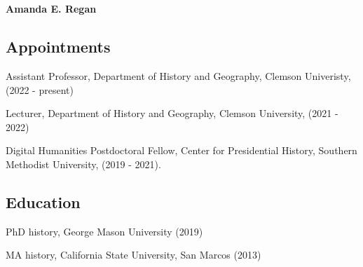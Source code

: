 \documentclass[11pt]{article}
\begin{document}
\thispagestyle{fancy}
\fancyfoot{}
\fancyhead{}
\renewcommand{\headrulewidth}{0pt}


\hfill\hfill\hfill
\hfill\hfill\hfill
\hfill\hfill\hfill
\hfill\hfill\hfill
\begin{minipage}[t]{1.6in}
   \\
   \\
\end{minipage}
\hfill
\begin{minipage}[t]{1.9in}
\end{minipage}


\vspace{0.1in}

{\Large\bfseries Amanda E. Regan}

\subsection{Appointments}\label{current-position}

Assistant Professor, Department of History and Geography, Clemson Univeristy, (2022 - present)

Lecturer, Department of History and Geography, Clemson University, (2021 - 2022)

Digital Humanities Postdoctoral Fellow, Center for Presidential History, Southern Methodist University, (2019 - 2021).

\subsection{Education}\label{education}
PhD history, George Mason University (2019)

MA history, California State University, San Marcos (2013)
\end{document}
